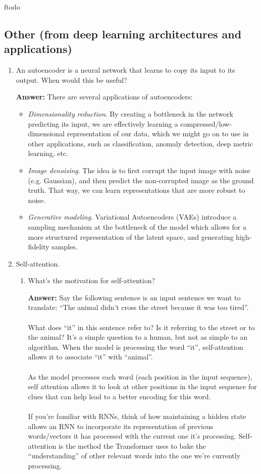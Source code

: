 ƒtodo\documentclass{article}
\newenvironment{QandA}{\begin{enumerate}[label=\arabic*.]}{\end{enumerate}}
\newenvironment{InnerQandA}{\begin{enumerate}[label=\roman*.]}{\end{enumerate}}
\newenvironment{answer}{\par\normalfont \textbf{Answer:}}{}
\begin{document}
\subsection{Other (from deep learning architectures and applications)}
\begin{QandA}
    \item An autoencoder is a neural network that learns to copy its input to its output. When would this be useful?
    \begin{answer}
        There are several applications of autoencoders:
        \begin{itemize}
            \item \textit{Dimensionality reduction}. By creating a bottleneck in the network predicting its input, we are effectively learning a compressed/low-dimensional representation of our data, which we might go on to use in other applications, such as classification, anomaly detection, deep metric learning, etc.
            \item \textit{Image denoising}. The idea is to first corrupt the input image with noise (e.g. Gaussian), and then predict the non-corrupted image as the ground truth. That way, we can learn representations that are more robust to noise. 
            \item \textit{Generative modeling}. Variational Autoencoders (VAEs) introduce a sampling mechanism at the bottleneck of the model which allows for a more structured representation of the latent space, and generating high-fidelity samples. 
        \end{itemize}
    \end{answer}

    \item Self-attention.
    \begin{InnerQandA}
        \item What’s the motivation for self-attention?
        \begin{answer}
            Say the following sentence is an input sentence we want to translate: ``The animal didn't cross the street because it was too tired''. \\\\
            What does “it” in this sentence refer to? Is it referring to the street or to the animal? It’s a simple question to a human, but not as simple to an algorithm. When the model is processing the word “it”, self-attention allows it to associate “it” with “animal”. \\\\
            As the model processes each word (each position in the input sequence), self attention allows it to look at other positions in the input sequence for clues that can help lead to a better encoding for this word.\\\\
            If you’re familiar with RNNs, think of how maintaining a hidden state allows an RNN to incorporate its representation of previous words/vectors it has processed with the current one it’s processing. Self-attention is the method the Transformer uses to bake the “understanding” of other relevant words into the one we’re currently processing.


\end{answer}
\end{InnerQandA}
\end{QandA}
\end{document}
